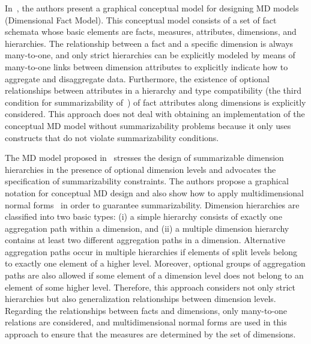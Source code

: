 In~\cite{DBLP:journals/ijcis/GolfarelliMR98}, the authors present a
graphical conceptual model for designing MD models (Dimensional Fact
Mo\-del). This conceptual model consists of a set of fact schemata
whose basic elements are facts, measures, attributes, dimensions,
and hierarchies. The relationship between a fact and a specific
dimension is always many-to-one, and only strict hierarchies can be
explicitly modeled by means of many-to-one links between dimension
attributes to explicitly indicate how to aggregate and disaggregate
data. Furthermore, the existence of optional relationships between
attributes in a hierarchy and type compatibility (the third
condition for summarizability of~\cite{DBLP:conf/ssdbm/LenzS97}) of
fact attributes along dimensions is explicitly considered. This
approach does not deal with obtaining an implementation of the
conceptual MD model without summarizability problems because it only
uses constructs that do not violate summarizability conditions.

The MD model proposed in~\cite{DBLP:conf/dmdw/HusemannLV00} stresses
the design of summarizable dimension hierarchies in the presence of
optional dimension levels and advocates the specification of
summarizability constraints.  The authors propose a graphical
notation for conceptual MD design and also show how to apply
multidimensional normal
forms~\cite{DBLP:conf/ssdbm/LehnerAW98,DBLP:conf/dmdw/HusemannLV00,DBLP:journals/is/LechtenborgerV03}
in order to guarantee summarizability.  Dimension hierarchies are
classified into two basic types: (i) a simple hierarchy consists of
exactly one aggregation path within a dimension, and (ii) a multiple
dimension hierarchy contains at least two different aggregation
paths in a dimension.  Alternative aggregation paths occur in
multiple hierarchies if elements of split levels belong to exactly
one element of a higher level.  Moreover, optional groups of
aggregation paths are also allowed if some element of a dimension
level does not belong to an element of some higher level. Therefore,
this approach considers not only strict hierarchies but also
generalization relationships between dimension levels. Regarding the
relationships between facts and dimensions, only many-to-one
relations are considered, and multidimensional normal forms are used
in this approach to ensure that the measures are determined by the
set of dimensions.

